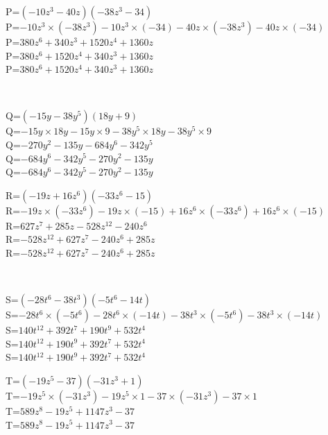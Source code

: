 \documentclass{article}%
\begin{document}
\begin{minipage}{0.5\textwidth}%
P=$(-10z^3-40z)(-38z^3-34)$\\%
P=$-10z^3 \times (-38z^3)-10z^3 \times (-34)-40z \times (-38z^3)-40z \times (-34)$\\%
P=$380z^6+340z^3+1520z^4+1360z$\\%
P=$380z^6+1520z^4+340z^3+1360z$\\%
P=$380z^6+1520z^4+340z^3+1360z$\\%
\end{minipage}%
\\%
\begin{minipage}{0.5\textwidth}%
Q=$(-15y-38y^5)(18y+9)$\\%
Q=$-15y \times 18y-15y \times 9-38y^5 \times 18y-38y^5 \times 9$\\%
Q=$-270y^2-135y-684y^6-342y^5$\\%
Q=$-684y^6-342y^5-270y^2-135y$\\%
Q=$-684y^6-342y^5-270y^2-135y$\\%
\end{minipage}%
\begin{minipage}{0.5\textwidth}%
R=$(-19z+16z^6)(-33z^6-15)$\\%
R=$-19z \times (-33z^6)-19z \times (-15)+16z^6 \times (-33z^6)+16z^6 \times (-15)$\\%
R=$627z^7+285z-528z^12-240z^6$\\%
R=$-528z^12+627z^7-240z^6+285z$\\%
R=$-528z^12+627z^7-240z^6+285z$\\%
\end{minipage}%
\\%
\begin{minipage}{0.5\textwidth}%
S=$(-28t^6-38t^3)(-5t^6-14t)$\\%
S=$-28t^6 \times (-5t^6)-28t^6 \times (-14t)-38t^3 \times (-5t^6)-38t^3 \times (-14t)$\\%
S=$140t^12+392t^7+190t^9+532t^4$\\%
S=$140t^12+190t^9+392t^7+532t^4$\\%
S=$140t^12+190t^9+392t^7+532t^4$\\%
\end{minipage}%
\begin{minipage}{0.5\textwidth}%
T=$(-19z^5-37)(-31z^3+1)$\\%
T=$-19z^5 \times (-31z^3)-19z^5 \times 1-37 \times (-31z^3)-37 \times 1$\\%
T=$589z^8-19z^5+1147z^3-37$\\%
T=$589z^8-19z^5+1147z^3-37$\\%
\end{minipage}%
\\

%
\end{document}
